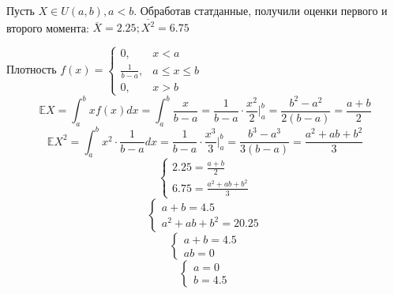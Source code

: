 \begin{example}
    Пусть \(X \in U(a, b), a < b\). Обработав статданные, получили оценки первого и второго момента: \(\overline{X} = 2.25; \overline{X^2} = 6.75\)
\end{example}
\begin{solution}
    Плотность \(f(x) = \begin{cases}
        0,               & x < a           \\
        \frac{1}{b - a}, & a \leq x \leq b \\
        0,               & x > b
    \end{cases}\)
    \[\mathbb{E} X = \int_a^b x f(x) dx = \int_a^b \frac{x}{b - a} = \frac{1}{b - a} \cdot \frac{x^2}{2}\Big|_a^b = \frac{b^2 - a^2}{2(b - a)} = \boxed{\frac{a + b}{2}}\]
    \[\mathbb{E} X^2 = \int_a^b x^2 \cdot \frac{1}{b - a} dx = \frac{1}{b - a} \cdot \frac{x^3}{3} \Big|_a^b = \frac{b^3 - a^3}{3(b - a)} = \boxed{\frac{a^2 + ab + b^2}{3}}\]
    \[\begin{cases}
            2.25 = \frac{a + b}{2} \\
            6.75 = \frac{a^2 + ab + b^2}{3}
        \end{cases}\]
    \[\begin{cases}
            a + b = 4.5 \\
            a^2 + ab + b^2 = 20.25
        \end{cases}\]
    \[\begin{cases}
            a + b = 4.5 \\
            ab = 0
        \end{cases}\]
    \[\begin{cases}
            a = 0 \\
            b = 4.5
        \end{cases}\]
\end{solution}
